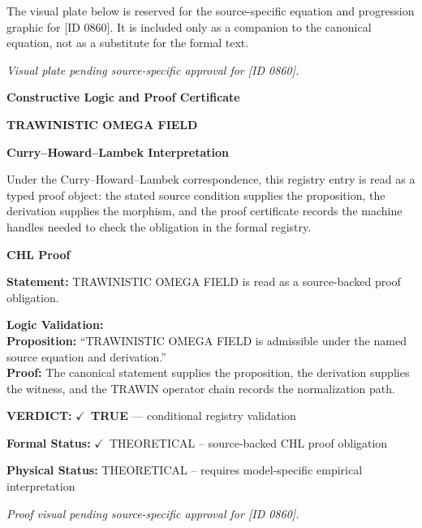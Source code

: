\begingroup\footnotesize\sloppy
The visual plate below is reserved for the source-specific equation and progression graphic for [ID 0860]. It is included only as a companion to the canonical equation, not as a substitute for the formal text.
\par\endgroup
\begingroup\footnotesize\itshape
Visual plate pending source-specific approval for [ID 0860].
\par\endgroup

\clearpage
\begingroup\tzpsupportsetup
\noindent\textbf{\fontsize{10.8pt}{12.8pt}\selectfont [ID 0860] Constructive Logic and Proof Certificate}\par
\noindent\textbf{\fontsize{10pt}{12pt}\selectfont TRAWINISTIC OMEGA FIELD}\par
\vspace{0.45em}
\begingroup
\footnotesize
\setlength{\parskip}{0.22em}
\setlength{\parindent}{0pt}
\noindent\textbf{Curry--Howard--Lambek Interpretation}\par
Under the Curry--Howard--Lambek correspondence, this registry entry is read as a typed proof
object: the stated source condition supplies the proposition, the derivation supplies the
morphism, and the proof certificate records the machine handles needed to check the obligation
in the formal registry.

\vspace{0.45em}
\noindent\textbf{CHL Proof}\par
\textbf{Statement:} TRAWINISTIC OMEGA FIELD is read as a source-backed proof obligation.

\textbf{Logic Validation:}\\
\textbf{Proposition:} ``TRAWINISTIC OMEGA FIELD is admissible under the named source equation and derivation.''\\
\textbf{Proof:} The canonical statement supplies the proposition, the derivation supplies the witness, and the TRAWIN operator chain records the normalization path.

\textbf{VERDICT:} \ensuremath{\checkmark}\ \textbf{TRUE} --- conditional registry validation

\textbf{Formal Status:} \ensuremath{\checkmark}\ THEORETICAL -- source-backed CHL proof obligation

\textbf{Physical Status:} THEORETICAL -- requires model-specific empirical interpretation
\par\vspace{0.45em}
\par
\vfill
\begingroup\footnotesize\itshape
Proof visual pending source-specific approval for [ID 0860].
\par\endgroup
\vfill
\endgroup
\endgroup
